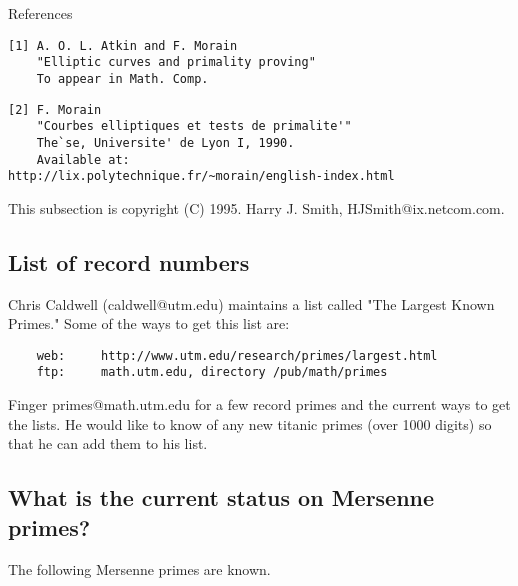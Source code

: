 References 

\begin{verbatim}
[1] A. O. L. Atkin and F. Morain
    "Elliptic curves and primality proving"
    To appear in Math. Comp.

\end{verbatim}

\begin{verbatim}
[2] F. Morain
    "Courbes elliptiques et tests de primalite'"
    The`se, Universite' de Lyon I, 1990.
    Available at:
http://lix.polytechnique.fr/~morain/english-index.html
\end{verbatim}

This subsection is copyright (C) 1995. Harry J. Smith, HJSmith@ix.netcom.com. 

\subsection{List of record numbers}

  Chris Caldwell (caldwell@utm.edu) maintains a list called "The Largest
   Known Primes."  Some of the ways to get this list are:

\begin{verbatim}
    web:     http://www.utm.edu/research/primes/largest.html
    ftp:     math.utm.edu, directory /pub/math/primes
\end{verbatim}
   Finger primes@math.utm.edu for a few record primes and the current
   ways to get the lists.  He would like to know of any new titanic
   primes (over 1000 digits) so that he can add them to his list.





\subsection{What is the current status on Mersenne primes?}

The following Mersenne primes are known.


